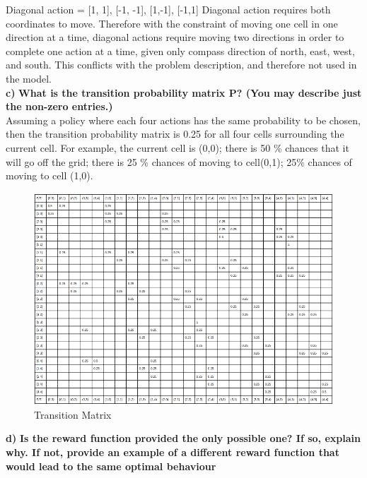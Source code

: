 \documentclass[11pt]{article}
\begin{document}
\noindent
Diagonal action ={ [1, 1], [-1, -1], [1,-1], [-1,1]} Diagonal action requires
both coordinates to move. Therefore with the constraint of moving one cell in
one direction at a time, diagonal actions require moving two directions in order
to complete one action at a time, given only compass direction of north, east,
west, and south. This conflicts with the problem description, and therefore not
used in the model.
\\


\noindent
\textbf{c)}
\noindent
\textbf{What is the transition probability matrix P? (You may describe just
the non-zero entries.)}
\\

\noindent
Assuming a policy where each four actions has the same probability to be chosen,
then the transition probability matrix is 0.25 for all four cells surrounding
the current cell. For example, the current cell is (0,0); there is 50 \% chances
that it will go off the grid; there is 25 \% chances of moving to cell(0,1);
25\% chances of moving to cell (1,0). 
\\

\begin{figure}[h]
\includegraphics[scale=0.5]{transition_matrix}
\centering
\caption{Transition Matrix}
\end{figure}


\noindent
\textbf{d)}
\noindent
\textbf{Is the reward function provided the only possible one? If so, explain
why. If not, provide an example of a different reward function that would lead
to the same optimal behaviour}
\\
\end{document}

